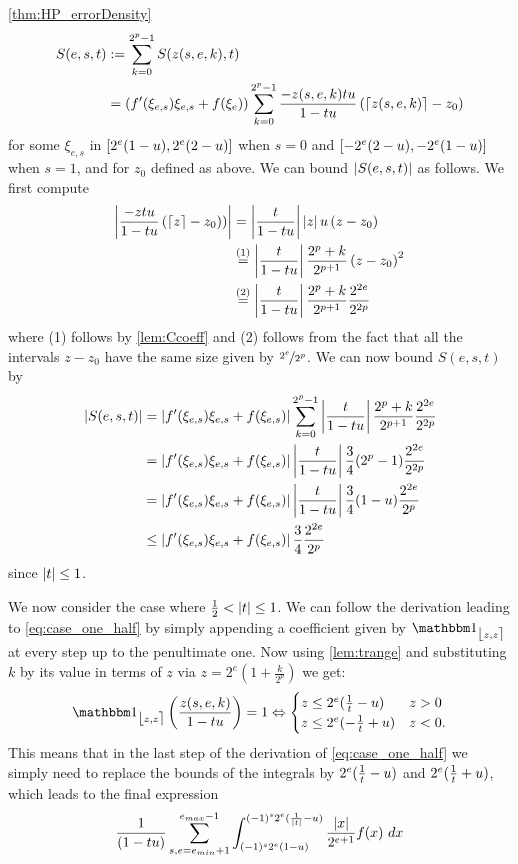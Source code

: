\begin{myproof}{\cref{thm:HP_errorDensity}}
\begin{align*}
S(e,s,t)& \mathrel{:=} \sum_{k=0}^{2^p-1}S(z(s,e,k), t) \\
&= \left(f'(\xi_{e,s})\xi_{e,s} + f(\xi_e)\right)\sum_{k=0}^{2^p-1}\frac{-z(s,e,k)tu}{1-tu}\left(\lceil z(s,e,k) \rceil-z_0\right)
\end{align*}
for some $\xi_{e,s}$ in $[2^e(1-u), 2^e(2-u)]$ when $s=0$ and  $[-2^e(2-u), -2^e(1-u)]$ when $s=1$,  and for $z_0$ defined as above. We can bound $\left\lvert S(e,s,t)\right\rvert$ as follows. We first compute
\begin{align*}
\left\lvert \frac{-ztu}{1-tu}\left(\lceil z \rceil-z_0\right))\right\rvert&=\left\lvert \frac{t}{1-tu}\right\rvert \left\lvert z\right\rvert u\left(z-z_0\right)\\
&\stackrel{(1)}{=}\left\lvert \frac{t}{1-tu}\right\rvert \frac{2^p+k}{2^{p+1}}\left(z-z_0\right)^2\\
&\stackrel{(2)}{=}\left\lvert \frac{t}{1-tu}\right\rvert \frac{2^p+k}{2^{p+1}}\frac{2^{2e}}{2^{2p}}
\end{align*}
where (1) follows by \cref{lem:Ccoeff} and (2) follows from the fact that all the intervals $z-z_0$ have the same size given by $\nicefrac{2^e}{2^p}$. We can now bound $S(e,s,t)$ by
\begin{align}
\left\lvert S(e,s,t)\right\rvert&= \left\lvert f'(\xi_{e,s})\xi_{e,s} + f(\xi_{e,s})\right\rvert\sum_{k=0}^{2^p-1} \left\lvert \frac{t}{1-tu}\right\rvert \frac{2^p+k}{2^{p+1}}\frac{2^{2e}}{2^{2p}}\nonumber \\
&=  \left\lvert f'(\xi_{e,s})\xi_{e,s} + f(\xi_{e,s})\right\rvert\left\lvert \frac{t}{1-tu}\right\rvert \frac{3}{4}(2^p-1)\frac{2^{2e}}{2^{2p}}\nonumber \\
&=  \left\lvert f'(\xi_{e,s})\xi_{e,s} + f(\xi_{e,s})\right\rvert\left\lvert \frac{t}{1-tu}\right\rvert \frac{3}{4}(1-u)\frac{2^{2e}}{2^{p}}\nonumber \\
& \leq \left\lvert f'(\xi_{e,s})\xi_{e,s} + f(\xi_{e,s})\right\rvert \frac{3}{4}\frac{2^{2e}}{2^{p}}\label{eq:error_term}
\end{align}
since $\left\lvert t\right\rvert\leq 1$.

We now consider the case where $\frac{1}{2}<\left\lvert t\right\rvert\leq 1$.  We can follow the derivation leading to  \cref{eq:case_one_half} by simply appending a coefficient given by $\one_{\fintvl[z]}$ at every step up to the penultimate one.  Now using \cref{lem:trange} and substituting $k$ by its value in terms of $z$ via $z=2^e(1+\frac{k}{2^p})$ we get:
\[
\one_{\fintvl[z]}\left(\frac{z(s,e,k)}{1-t\uro}\right) = 1\Leftrightarrow
\begin{cases}
 z\leq 2^e(\frac{1}{t}-\uro) & z> 0\\
 z\leq 2^e(-\frac{1}{t}+\uro) & z <0.
\end{cases}
\]
This means that in the last step of the derivation of  \cref{eq:case_one_half} we simply need to replace the bounds of the integrals by $2^e(\frac{1}{t}-u)$ and $2^e(\frac{1}{t}+u)$, which leads to the final expression
\[
\frac{1}{(1-tu)}\sum\limits_{s, e=e_{min}+1}^{e_{max}-1} \int_{(-1)^s2^e(1-u)}^{(-1)^s2^e(\frac{1}{\left\lvert t\right\rvert}-u)}\frac{\left\lvert x\right\rvert}{2^{e+1}} f(x) ~dx 
\]


\end{myproof}
